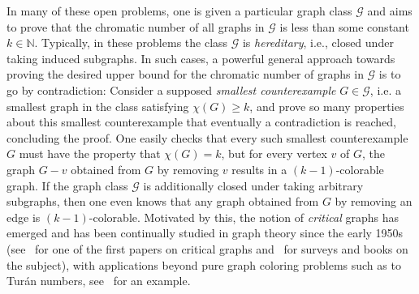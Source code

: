 \documentclass[a4paper,10pt,hidelinks]{amsart}
\theoremstyle{definition}
\begin{document}
In many of these open problems, one is given a particular graph class $\mathcal{G}$ and aims to prove that the chromatic number of all graphs in $\mathcal{G}$ is less than some constant 
$k\in \mathbb{N}$. Typically, in these problems the class $\mathcal{G}$ is \emph{hereditary}, i.e., closed under taking induced subgraphs. In such cases, a powerful general approach towards proving the desired upper bound for the chromatic number of graphs in $\mathcal{G}$ is to go by contradiction: Consider a supposed \emph{smallest counterexample} $G\in \mathcal{G}$, i.e. a smallest graph in the class satisfying $\chi(G)\ge k$, and prove so many properties about this smallest counterexample that eventually a contradiction is reached, concluding the proof. One easily checks that every such smallest counterexample $G$ must have the property that $\chi(G)=k$, but for every vertex $v$ of $G$, the graph $G-v$ obtained from $G$ by removing $v$ results in a $(k-1)$-colorable graph. If the graph class $\mathcal{G}$ is additionally closed under taking arbitrary subgraphs, then one even knows that any graph obtained from $G$ by removing an edge is $(k-1)$-colorable. Motivated by this, the notion of \emph{critical} graphs has emerged and has been continually studied in graph theory since the early 1950s (see~\cite{dirac} for one of the first papers on critical graphs and~\cite{jensentoft,kostochka,stiebitz} for surveys and books on the subject), with applications beyond pure graph coloring problems such as to Tur\'{a}n numbers, see~\cite{simonovits} for an example. 
\end{document}
